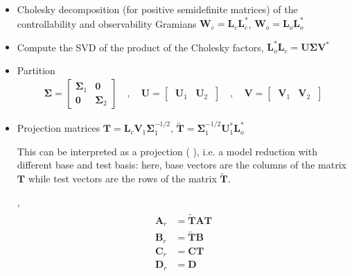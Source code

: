 \documentclass[letterpaper,10pt,english]{jupyterBook}
\begin{document}
\sphinxAtStartPar
{}
\begin{itemize}
\item {} 
\sphinxAtStartPar
Cholesky decomposition (for positive semi\sphinxhyphen{}definite matrices) of the controllability and observability Gramians \(\mathbf{W}_c = \mathbf{L}_c \mathbf{L}_c^*\), \(\mathbf{W}_o = \mathbf{L}_o \mathbf{L}_o^*\)

\item {} 
\sphinxAtStartPar
Compute the SVD of the product of the Cholesky factors, \(\mathbf{L}_o^* \mathbf{L}_c = \mathbf{U} \boldsymbol\Sigma \mathbf{V}^*\)

\item {} 
\sphinxAtStartPar
Partition
\begin{equation*}
\begin{split}
    \boldsymbol\Sigma = \begin{bmatrix} \boldsymbol\Sigma_1 & \mathbf{0} \\ \mathbf{0} & \boldsymbol\Sigma_2 \end{bmatrix}
    \quad , \quad \mathbf{U} = \begin{bmatrix} \ \mathbf{U}_1 & \mathbf{U}_2 \ \end{bmatrix}
    \quad , \quad \mathbf{V} = \begin{bmatrix} \ \mathbf{V}_1 & \mathbf{V}_2 \ \end{bmatrix}
    \end{split}
\end{equation*}
\item {} 
\sphinxAtStartPar
Projection matrices \(\mathbf{T} = \mathbf{L}_c \mathbf{V}_1 \boldsymbol\Sigma_1^{-1/2}\), \(\widetilde{\mathbf{T}} = \boldsymbol\Sigma_1^{-1/2} \mathbf{U}_1^* \mathbf{L}_o^*\)%
\begin{footnote}[2]\sphinxAtStartFootnote
This can be interpreted as a  projection ( ), i.e. a model reduction with different base and test basis: here, base vectors are the columns of the matrix \(\mathbf{T}\) while test vectors are the rows of the matrix \(\widetilde{\mathbf{T}}\).
%
\end{footnote},
\begin{equation*}
\begin{split}\begin{aligned}
      \mathbf{A}_r & = \widetilde{\mathbf{T}} \mathbf{A} \mathbf{T} \\
      \mathbf{B}_r & = \widetilde{\mathbf{T}} \mathbf{B}            \\
      \mathbf{C}_r & =                        \mathbf{C} \mathbf{T} \\
      \mathbf{D}_r & =                        \mathbf{D}            \\
    \end{aligned}\end{split}
\end{equation*}
\end{itemize}
\end{document}
